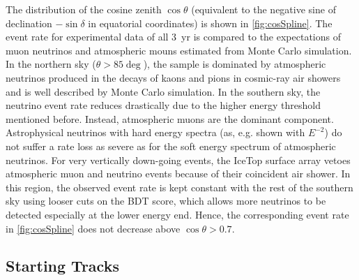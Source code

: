 \documentclass[aps,10pt,prd,twocolumn,floats,letterpaper,showpacs,nofootinbib,bibnotes,notitlepage,superscriptaddress]{revtex4-1}
\begin{document}
The distribution of the cosine zenith $\cos\theta$ (equivalent to the
negative sine of declination $-\sin\delta$ in equatorial coordinates) is shown
in \ref{fig:cosSpline}. The event rate for experimental data of all 3~yr is
compared to the expectations of muon neutrinos and atmospheric mouns estimated
from Monte Carlo simulation. In the northern sky ($\theta>85\deg$), the sample
is dominated by atmospheric neutrinos produced in the decays of kaons and pions
in cosmic-ray air showers~\citep{Honda:2006qj} and is well described by Monte
Carlo simulation. In the southern sky, the neutrino event rate reduces
drastically due to the higher energy threshold mentioned before.  Instead,
atmospheric muons are the dominant component. Astrophysical neutrinos with hard
energy spectra (as, e.g. shown with $E^{-2}$) do not suffer a rate loss as
severe as for the soft energy spectrum of atmospheric neutrinos. For very
vertically down-going events, the IceTop surface array vetoes atmospheric muon
and neutrino events because of their coincident air shower. In this region, the
observed event rate is kept constant with the rest of the southern sky using
looser cuts on the BDT score, which allows more neutrinos to be detected
especially at the lower energy end. Hence, the corresponding event rate in
\ref{fig:cosSpline} does not decrease above $\cos\theta>0.7$.

\subsection{Starting Tracks}
\end{document}

